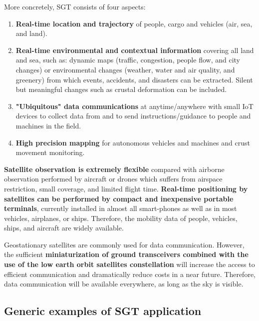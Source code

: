 More concretely, SGT consists of four aspects:

\begin{enumerate}

\item \textbf{Real-time location and trajectory} of people, cargo and vehicles (air, sea, and land).

\item \textbf{Real-time environmental and contextual information} covering all land and sea, such as: dynamic maps (traffic, congestion, people flow, and city changes) or environmental changes (weather, water and air quality, and greenery) from which events, accidents, and disasters can be extracted. Silent but meaningful changes such as crustal deformation can be included.

\item \textbf{"Ubiquitous" data communications} at anytime/anywhere with small IoT devices to collect data from and to send instructions/guidance to people and machines in the field.

\item \textbf{High precision mapping} for autonomous vehicles and machines and crust movement monitoring.

\end{enumerate}


\vspace{0.4 cm}

\textbf{Satellite observation is extremely flexible} compared with airborne observation performed by aircraft or drones which suffers from airspace restriction, small coverage, and limited flight time. \textbf{Real-time positioning by satellites can be performed by compact and inexpensive portable terminals}, currently installed in almost all smart-phones as well as in most vehicles, airplanes, or ships. Therefore, the mobility data of people, vehicles, ships, and aircraft are widely available.

\vspace{0.4 cm}

Geostationary satellites are commonly used for data communication. However, the sufficient \textbf{miniaturization of ground transceivers combined with the use of the low earth orbit satellites constellation} will increase the access to efficient communication and dramatically reduce costs in a near future. Therefore, data communication will be available everywhere, as long as the sky is visible. 


\subsection{Generic examples of SGT application}

